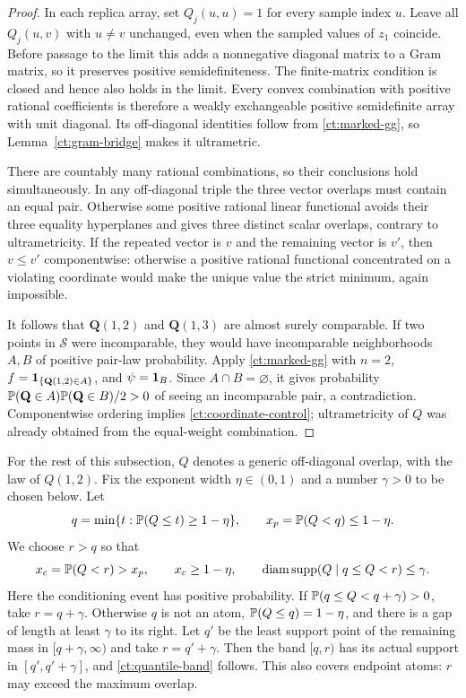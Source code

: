\begin{proof}
In each replica array, set $Q_j(u,u)=1$ for every sample index $u$.
Leave all $Q_j(u,v)$ with $u\ne v$ unchanged, even when the sampled
values of $z_1$ coincide.  Before passage to the limit this adds a
nonnegative diagonal matrix to a Gram matrix, so it
preserves positive semidefiniteness.  The finite-matrix condition is
closed and hence also holds in the limit.  Every convex combination
with positive rational coefficients is therefore a weakly exchangeable
positive semidefinite array with unit diagonal.  Its off-diagonal
identities follow from \eqref{ct:marked-gg}, so
Lemma~\ref{ct:gram-bridge} makes it ultrametric.

There are countably many rational combinations, so their conclusions
hold simultaneously.  In any off-diagonal triple the three vector
overlaps must contain an equal pair.  Otherwise some positive
rational linear functional avoids their three equality hyperplanes
and gives three distinct scalar overlaps, contrary to ultrametricity.
If the repeated vector is $v$ and the remaining vector is $v'$, then
$v\le v'$ componentwise: otherwise a positive rational functional
concentrated on a violating coordinate would make the unique value
the strict minimum, again impossible.

It follows that $\mathbf Q(1,2)$ and $\mathbf Q(1,3)$ are almost
surely comparable.  If two points in $\mathcal S$ were incomparable,
they would have incomparable neighborhoods $A,B$ of positive
pair-law probability.  Apply \eqref{ct:marked-gg} with $n=2$,
$f=\mathbf 1_{\{\mathbf Q(1,2)\in A\}}$, and
$\psi=\mathbf 1_B$.  Since $A\cap B=\varnothing$, it gives probability
$\mathbb P(\mathbf Q\in A)\mathbb P(\mathbf Q\in B)/2>0$ of seeing an
incomparable pair, a contradiction.  Componentwise ordering implies
\eqref{ct:coordinate-control}; ultrametricity of $Q$ was already
obtained from the equal-weight combination.
\end{proof}

For the rest of this subsection, $Q$ denotes a generic off-diagonal
overlap, with the law of $Q(1,2)$.  Fix the exponent width $\eta\in(0,1)$ and a number $\gamma>0$ to be
chosen below.  Let
\[
 q=\min\{t:\mathbb P(Q\le t)\ge1-\eta\},
 \qquad x_p=\mathbb P(Q<q)\le1-\eta.
\]
We choose $r>q$ so that
\begin{equation}\label{ct:quantile-band}
 x_c=\mathbb P(Q<r)>x_p,\qquad x_c\ge1-\eta,
 \qquad \operatorname{diam}\operatorname{supp}(Q\mid q\le Q<r)\le\gamma.
\end{equation}
Here the conditioning event has positive probability.  If
$\mathbb P(q\le Q<q+\gamma)>0$, take $r=q+\gamma$.  Otherwise $q$ is
not an atom, $\mathbb P(Q\le q)=1-\eta$, and there is a gap of length
at least $\gamma$ to its right.  Let $q'$ be the least support point
of the remaining mass in $[q+\gamma,\infty)$ and take
$r=q'+\gamma$.  Then the band $[q,r)$ has its actual support in
$[q',q'+\gamma]$, and \eqref{ct:quantile-band} follows.  This
also covers endpoint atoms: $r$ may exceed the maximum overlap.

